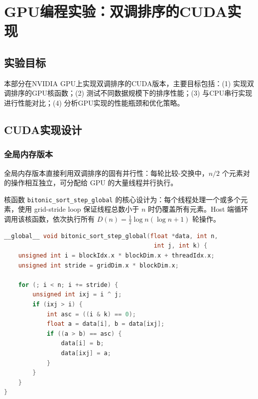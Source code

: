 \documentclass[UTF8,a4paper,10pt]{ctexart}
\begin{document}
\section{GPU编程实验：双调排序的CUDA实现}

\subsection{实验目标}

本部分在NVIDIA GPU上实现双调排序的CUDA版本，主要目标包括：(1) 实现双调排序的GPU核函数；(2) 测试不同数据规模下的排序性能；(3) 与CPU串行实现进行性能对比；(4) 分析GPU实现的性能瓶颈和优化策略。

\subsection{CUDA实现设计}

\subsubsection{全局内存版本}

全局内存版本直接利用双调排序的固有并行性：每轮比较-交换中，$n/2$ 个元素对的操作相互独立，可分配给 GPU 的大量线程并行执行。

核函数 \texttt{bitonic\_sort\_step\_global} 的核心设计为：每个线程处理一个或多个元素，使用 grid-stride loop 保证线程总数小于 $n$ 时仍覆盖所有元素。Host 端循环调用该核函数，依次执行所有 $D(n) = \frac{1}{2}\log n(\log n + 1)$ 轮操作。

\begin{lstlisting}[language=C++]
__global__ void bitonic_sort_step_global(float *data, int n,
                                          int j, int k) {
    unsigned int i = blockIdx.x * blockDim.x + threadIdx.x;
    unsigned int stride = gridDim.x * blockDim.x;

    for (; i < n; i += stride) {
        unsigned int ixj = i ^ j;
        if (ixj > i) {
            int asc = ((i & k) == 0);
            float a = data[i], b = data[ixj];
            if ((a > b) == asc) {
                data[i] = b;
                data[ixj] = a;
            }
        }
    }
}
\end{lstlisting}
\end{document}
